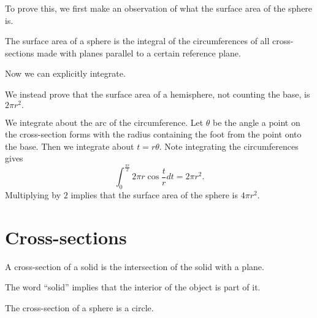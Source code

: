 To prove this, we first make an observation of what the surface area of the sphere is.

\begin{fact}
The surface area of a sphere is the integral of the circumferences of all cross-sections made with planes parallel to a certain reference plane.
\end{fact}

Now we can explicitly integrate.

\begin{pro} %
We instead prove that the surface area of a hemisphere, not counting the base, is $2\pi r^2.$

We integrate about the arc of the circumference. Let $\theta$ be the angle a point on the cross-section forms with the radius containing the foot from the point onto the base. Then we integrate about $t=r\theta.$ Note integrating the circumferences gives
\[\int_0^{\frac{\pi r}{2}}2\pi r\cos\frac{t}{r}dt=2\pi r^2.\]
Multiplying by $2$ implies that the surface area of the sphere is $4\pi r^2.$

\begin{center}
\end{center}
\end{pro}

\section{Cross-sections}

\begin{defi}
A cross-section of a solid is the intersection of the solid with a plane.
\end{defi}

The word “solid” implies that the interior of the object is part of it.

\begin{theo}
The cross-section of a sphere is a circle.
\end{theo}

